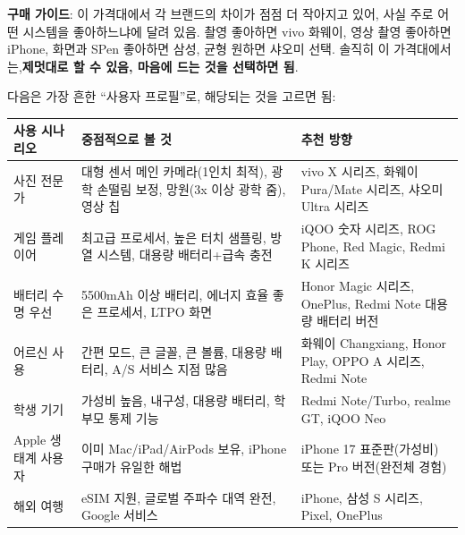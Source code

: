 \textbf{구매 가이드}: 이 가격대에서 각 브랜드의 차이가 점점 더 작아지고 있어, 사실 주로 어떤 시스템을 좋아하느냐에 달려 있음. 촬영 좋아하면 vivo 화웨이, 영상 촬영 좋아하면 iPhone, 화면과 SPen 좋아하면 삼성, 균형 원하면 샤오미 선택. 솔직히 이 가격대에서는,\textbf{제멋대로 할 수 있음, 마음에 드는 것을 선택하면 됨}.


다음은 가장 흔한 “사용자 프로필”로, 해당되는 것을 고르면 됨:

\begin{center}
\begin{tabularx}{\linewidth}{|X|X|X|}
\hline
\textbf{사용 시나리오} & \textbf{중점적으로 볼 것} & \textbf{추천 방향} \tabularnewline
\hline
사진 전문가 & 대형 센서 메인 카메라(1인치 최적), 광학 손떨림 보정, 망원(3x 이상 광학 줌), 영상 칩 & vivo X 시리즈, 화웨이 Pura/Mate 시리즈, 샤오미 Ultra 시리즈 \tabularnewline
게임 플레이어 & 최고급 프로세서, 높은 터치 샘플링, 방열 시스템, 대용량 배터리+급속 충전 & iQOO 숫자 시리즈, ROG Phone, Red Magic, Redmi K 시리즈 \tabularnewline
배터리 수명 우선 & 5500mAh 이상 배터리, 에너지 효율 좋은 프로세서, LTPO 화면 & Honor Magic 시리즈, OnePlus, Redmi Note 대용량 배터리 버전 \tabularnewline
어르신 사용 & 간편 모드, 큰 글꼴, 큰 볼륨, 대용량 배터리, A/S 서비스 지점 많음 & 화웨이 Changxiang, Honor Play, OPPO A 시리즈, Redmi Note \tabularnewline
학생 기기 & 가성비 높음, 내구성, 대용량 배터리, 학부모 통제 기능 & Redmi Note/Turbo, realme GT, iQOO Neo \tabularnewline
Apple 생태계 사용자 & 이미 Mac/iPad/AirPods 보유, iPhone 구매가 유일한 해법 & iPhone 17 표준판(가성비) 또는 Pro 버전(완전체 경험) \tabularnewline
해외 여행 & eSIM 지원, 글로벌 주파수 대역 완전, Google 서비스 & iPhone, 삼성 S 시리즈, Pixel, OnePlus \tabularnewline
\hline
\end{tabularx}
\end{center}


